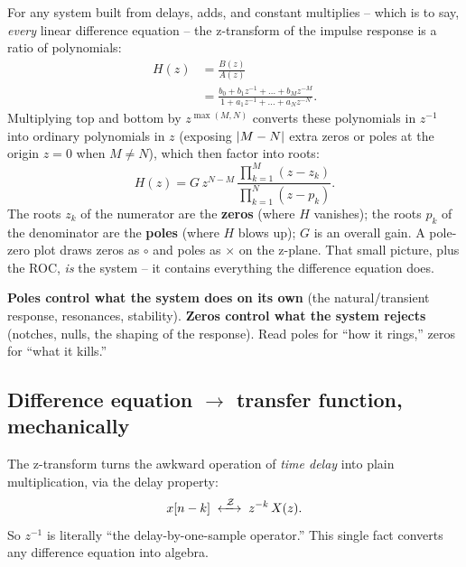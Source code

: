 For any system built from delays, adds, and constant multiplies -- which is to say,
\emph{every} linear difference equation -- the z-transform of the impulse response is a
ratio of polynomials:
\begin{align*}
  H(z) &= \frac{B(z)}{A(z)} \\
       &= \frac{b_0 + b_1 z^{-1} + \dots + b_M z^{-M}}{1 + a_1 z^{-1} + \dots + a_N z^{-N}}.
\end{align*}
Multiplying top and bottom by $z^{\max(M,N)}$ converts these polynomials in $z^{-1}$ into ordinary polynomials in $z$ (exposing $\lvert M-N\rvert$ extra zeros or poles at the origin $z=0$ when $M \neq N$), which then factor into roots:
\[
  H(z) = G\,z^{N-M}\,\frac{\prod_{k=1}^{M}(z - z_k)}{\prod_{k=1}^{N}(z - p_k)}.
\]
The roots $z_k$ of the numerator are the \textbf{zeros} (where $H$ vanishes); the roots
$p_k$ of the denominator are the \textbf{poles} (where $H$ blows up); $G$ is an overall
gain. A pole-zero plot draws zeros as $\circ$ and poles as $\times$ on the z-plane. That
small picture, plus the ROC, \emph{is} the system -- it contains everything the difference
equation does.

\begin{focusbox}
\textbf{Poles control what the system does on its own} (the natural/transient response,
resonances, stability). \textbf{Zeros control what the system rejects} (notches, nulls,
the shaping of the response). Read poles for ``how it rings,'' zeros for ``what it
kills.''
\end{focusbox}

\subsection{Difference equation $\to$ transfer function, mechanically}

The z-transform turns the awkward operation of \emph{time delay} into plain
multiplication, via the delay property:
\[
  x[n-k] \;\xleftrightarrow{\ \mathcal{Z}\ }\; z^{-k}\,X(z).
\]
So $z^{-1}$ is literally ``the delay-by-one-sample operator.'' This single fact converts
any difference equation into algebra.

